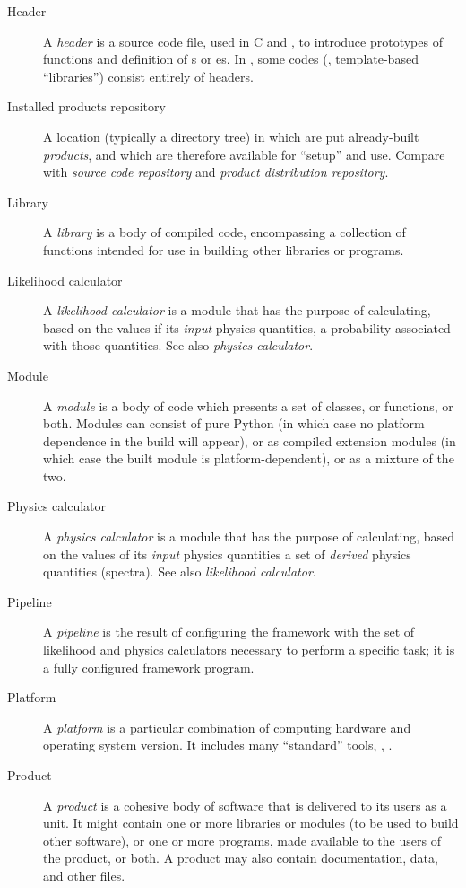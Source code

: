 \documentclass[draftmode,draftwater]{memarticle}
\begin{document}
\begin{description}
\item[Header] A \emph{header} is a source code file, used in C and \cpp,
  to introduce prototypes of functions and definition of s
  or es. In \cpp, some codes (\eg, template-based
  ``libraries'') consist entirely of headers.

\item[Installed products repository] A location (typically a directory
  tree) in which are put already-built \emph{products}, and which are
  therefore available for ``setup'' and use. Compare with \emph{source
    code repository} and \emph{product distribution repository}.

\item[Library] A \emph{library} is a body of compiled code, encompassing
  a collection of functions intended for use in building other libraries
  or programs.

\item[Likelihood calculator] A \emph{likelihood calculator} is a module
  that has the purpose of calculating, based on the values if its
  \emph{input} physics quantities, a probability associated with those
  quantities. See also \emph{physics calculator}.

\item[Module] A \emph{module} is a body of code which presents a set of
  classes, or functions, or both. Modules can consist of pure Python (in
  which case no platform dependence in the build will appear), or as
  compiled extension modules (in which case the built module is
  platform-dependent), or as a mixture of the two.

\item[Physics calculator] A \emph{physics calculator} is a module that
  has the purpose of calculating, based on the values of its
  \emph{input} physics quantities a set of \emph{derived} physics
  quantities (\eg spectra). See also \emph{likelihood calculator}.

\item[Pipeline] A \emph{pipeline} is the result of
  configuring the framework with the set of likelihood and physics
  calculators necessary to perform a specific task; it is a fully
  configured framework program.

\item[Platform] A \emph{platform} is a particular combination of
  computing hardware and operating system version. It includes many
  ``standard'' tools, \eg, .

\item[Product] A \emph{product} is a cohesive body of software that is
  delivered to its users as a unit. It might contain one or more
  libraries or modules (to be used to build other software), or one or
  more programs, made available to the users of the product, or both. A
  product may also contain documentation, data, and other files.


\end{description}
\end{document}
